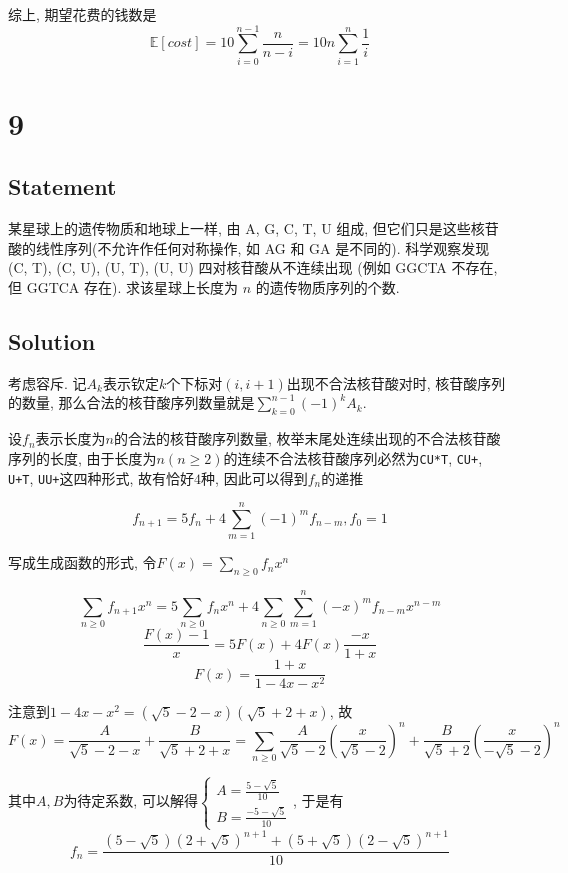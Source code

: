 \documentclass[UTF-8]{ctexart}
\begin{document}
综上, 期望花费的钱数是$$\mathbb E[cost] = 10\sum_{i=0}^{n-1}\frac{n}{n-i} = 10n\sum_{i=1}^{n}\frac 1i$$

\section*{9}
\subsection*{Statement}
某星球上的遗传物质和地球上一样, 由 A, G, C, T, U 组成, 但它们只是这些核苷酸的线性序列(不允许作任何对称操作, 如 AG 和 GA 是不同的). 科学观察发现 (C, T), (C, U), (U, T), (U, U) 四对核苷酸从不连续出现 (例如 GGCTA 不存在, 但 GGTCA 存在). 求该星球上长度为 $n$ 的遗传物质序列的个数.
\subsection*{Solution}

考虑容斥. 记$A_k$表示钦定$k$个下标对$(i, i+1)$出现不合法核苷酸对时, 核苷酸序列的数量, 那么合法的核苷酸序列数量就是$\sum\limits_{k = 0}^{n - 1}(-1)^{k}A_k$.

设$f_n$表示长度为$n$的合法的核苷酸序列数量, 枚举末尾处连续出现的不合法核苷酸序列的长度, 由于长度为$n(n \ge 2)$的连续不合法核苷酸序列必然为\texttt{CU*T}, \texttt{CU+}, \texttt{U+T}, \texttt{UU+}这四种形式, 故有恰好$4$种, 因此可以得到$f_n$的递推

\begin{equation}
f_{n + 1} = 5f_n + 4\sum_{m = 1}^{n}(-1)^mf_{n - m}, f_0 = 1
\end{equation}

写成生成函数的形式, 令$F(x) = \sum_{n \ge 0}f_nx^n$

\begin{equation}
\sum_{n \ge 0}f_{n + 1}x^n = 5\sum_{n \ge 0}f_nx^n + 4\sum_{n\ge 0}\sum_{m = 1}^{n}(-x)^mf_{n - m}x^{n - m}
\end{equation}
\begin{equation}
\frac{F(x) - 1}{x} = 5F(x) + 4F(x)\frac{-x}{1+x}
\end{equation}
\begin{equation}
F(x) = \frac{1 + x}{1 - 4x - x^2}
\end{equation}

注意到$1 - 4x - x^2 = (\sqrt5 - 2 - x)(\sqrt5 + 2 + x)$, 故$$F(x) = \frac{A}{\sqrt5 - 2 - x} + \frac{B}{\sqrt5 + 2 + x} = \sum_{n \ge 0}\frac{A}{\sqrt5 - 2}\left(\frac{x}{\sqrt5 - 2}\right)^n + \frac{B}{\sqrt5+2}\left(\frac{x}{-\sqrt5-2}\right)^n$$

其中$A, B$为待定系数, 可以解得$\begin{cases}
A = \frac{5 - \sqrt5}{10}\\B = \frac{-5-\sqrt5}{10}
\end{cases}$, 于是有
\begin{equation}
f_n = \frac{(5 - \sqrt5)(2 + \sqrt5)^{n+1} + (5 + \sqrt5)(2 - \sqrt5)^{n + 1}}{10}
\end{equation}
\end{document}
